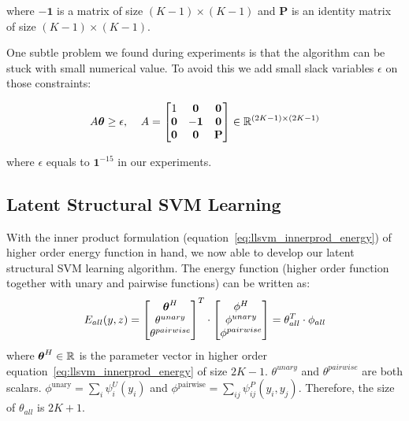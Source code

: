 \documentclass[sigconf, anonymous, review]{acmart}
\begin{document}
\noindent where $-\mathbf{1}$ is a matrix of size $(K-1)\times(K-1)$ and
$\mathbf{P}$ is an identity matrix of size $(K-1)\times(K-1)$.

One subtle problem we found during experiments is that the
algorithm can be stuck with small numerical value. To avoid this
we add small slack variables $\epsilon$ on those constraints:

\begin{align}
  \label{eq:concave_constraint}
  A\boldsymbol{\theta}\geq\epsilon \text{,\;~~~} A=
                  \begin{bmatrix}
                    1 & \mathbf{0} & \mathbf{0}\\
                    \mathbf{0} & -\mathbf{1} & \mathbf{0}\\
                    \mathbf{0} & \mathbf{0} & \mathbf{P}
                  \end{bmatrix}\in \mathbb{R}^{(2K-1)\times(2K-1)}
\end{align}

\noindent where $\epsilon$ equals to $\mathbf{1}^{-15}$ in our
experiments.

\subsection{Latent Structural SVM Learning}
\label{sec:mrflssvm_learning_algo}

With the inner product formulation
(equation~\eqref{eq:llsvm_innerprod_energy}) of higher order
energy function in hand, we now able to develop our latent
structural SVM learning algorithm. The energy function (higher
order function together with unary and pairwise functions) can be
written as:
\begin{equation}
  E_{all}(y,z) = \begin{bmatrix}
    \boldsymbol{\theta}^H\\
    \theta^{unary}\\
    \theta^{pairwise}
  \end{bmatrix}^T 
  \cdot \begin{bmatrix}
    \phi^H\\
    \phi^{unary}\\
    \phi^{pairwise}
  \end{bmatrix}=\theta_{all}^T\cdot\phi_{all}
\end{equation}
where $\boldsymbol{\theta}^H\in \mathbb{R}$ is the parameter vector in higher
order equation~\eqref{eq:llsvm_innerprod_energy} of size $2K-1$.
$\theta^{unary}$ and $\theta^{pairwise}$ are both scalars.
$\phi^\textrm{unary} = \sum_i \psi^U_i\!(y_i)$ and
$\phi^\textrm{pairwise} = \sum_{ij} \psi^P_{ij}(y_i, y_j)$.
Therefore, the size of $\theta_{all}$ is $2K+1$.
\end{document}
